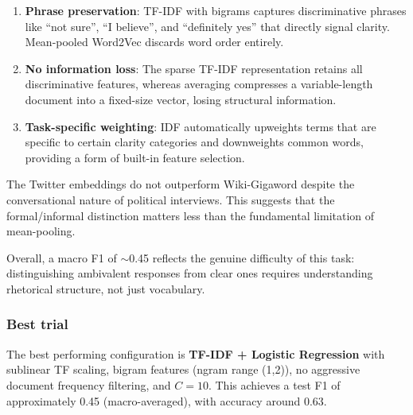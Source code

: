 \documentclass[12pt]{fphw}
\begin{document}
\begin{enumerate}
	\item \textbf{Phrase preservation}: TF-IDF with bigrams captures discriminative phrases like ``not sure'', ``I believe'', and ``definitely yes'' that directly signal clarity. Mean-pooled Word2Vec discards word order entirely.
	\item \textbf{No information loss}: The sparse TF-IDF representation retains all discriminative features, whereas averaging compresses a variable-length document into a fixed-size vector, losing structural information.
	\item \textbf{Task-specific weighting}: IDF automatically upweights terms that are specific to certain clarity categories and downweights common words, providing a form of built-in feature selection.
\end{enumerate}

The Twitter embeddings do not outperform Wiki-Gigaword despite the conversational nature of political interviews. This suggests that the formal/informal distinction matters less than the fundamental limitation of mean-pooling.

Overall, a macro F1 of $\sim$0.45 reflects the genuine difficulty of this task: distinguishing ambivalent responses from clear ones requires understanding rhetorical structure, not just vocabulary.

\subsubsection{Best trial}

The best performing configuration is \textbf{TF-IDF + Logistic Regression} with sublinear TF scaling, bigram features (ngram range (1,2)), no aggressive document frequency filtering, and $C=10$. This achieves a test F1 of approximately 0.45 (macro-averaged), with accuracy around 0.63.

\nocite{*}
\end{document}
